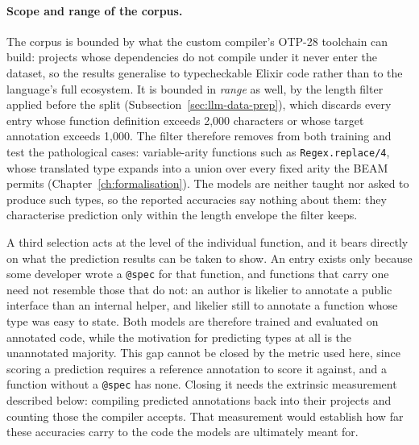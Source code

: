 \paragraph{Scope and range of the corpus.}
The corpus is bounded by what the custom compiler's OTP-28 toolchain can build: projects whose dependencies do not compile under it never enter the dataset, so the results generalise to typecheckable Elixir code rather than to the language's full ecosystem.
It is bounded in \emph{range} as well, by the length filter applied before the split (Subsection~\ref{sec:llm-data-prep}), which discards every entry whose function definition exceeds 2{,}000 characters or whose target annotation exceeds 1{,}000.
The filter therefore removes from both training and test the pathological cases: variable-arity functions such as \texttt{Regex.replace/4}, whose translated type expands into a union over every fixed arity the BEAM permits (Chapter~\ref{ch:formalisation}).
The models are neither taught nor asked to produce such types, so the reported accuracies say nothing about them: they characterise prediction only within the length envelope the filter keeps.

A third selection acts at the level of the individual function, and it bears directly on what the prediction results can be taken to show.
An entry exists only because some developer wrote a \texttt{@spec} for that function, and functions that carry one need not resemble those that do not: an author is likelier to annotate a public interface than an internal helper, and likelier still to annotate a function whose type was easy to state.
Both models are therefore trained and evaluated on annotated code, while the motivation for predicting types at all is the unannotated majority.
This gap cannot be closed by the metric used here, since scoring a prediction requires a reference annotation to score it against, and a function without a \texttt{@spec} has none.
Closing it needs the extrinsic measurement described below: compiling predicted annotations back into their projects and counting those the compiler accepts. That measurement would establish how far these accuracies carry to the code the models are ultimately meant for.

